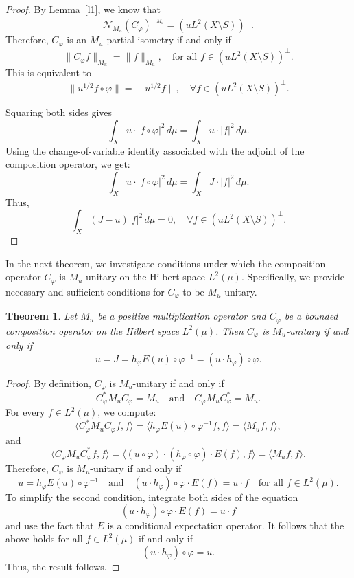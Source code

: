 \documentclass{amsart}
\newtheorem{thm}{Theorem}[section]
\theoremstyle{definition}\newtheorem{defn}[thm]{Definition}
\theoremstyle{remark}
\numberwithin{equation}{section}
\begin{document}
\begin{proof}
By Lemma~\ref{l1}, we know that
\[
\mathcal{N}_{M_u}(C_{\varphi})^{\perp_{M_u}} = \left(u L^2(X \setminus S)\right)^{\perp}.
\]
Therefore, \( C_{\varphi} \) is an \( M_u \)-partial isometry if and only if
\[
\|C_{\varphi} f\|_{M_u} = \|f\|_{M_u}, \quad \text{for all } f \in \left(u L^2(X \setminus S)\right)^{\perp}.
\]
This is equivalent to
\[
\|u^{1/2} f \circ \varphi\| = \|u^{1/2} f\|, \quad \forall f \in \left(u L^2(X \setminus S)\right)^{\perp}.
\]

Squaring both sides gives
\[
\int_X u \cdot |f \circ \varphi|^2 \, d\mu = \int_X u \cdot |f|^2 \, d\mu.
\]
Using the change-of-variable identity associated with the adjoint of the composition operator, we get:
\[
\int_X u \cdot |f \circ \varphi|^2 \, d\mu = \int_X J \cdot |f|^2 \, d\mu.
\]
Thus,
\[
\int_X (J - u) |f|^2 \, d\mu = 0, \quad \forall f \in \left(u L^2(X \setminus S)\right)^{\perp}.
\]
\end{proof}
In the next theorem, we investigate conditions under which the composition operator \( C_{\varphi} \) is \( M_u \)-unitary on the Hilbert space \( L^2(\mu) \). Specifically, we provide necessary and sufficient conditions for \( C_{\varphi} \) to be \( M_u \)-unitary.

\begin{thm}\label{t1.6}
Let \( M_u \) be a positive multiplication operator and \( C_{\varphi} \) be a bounded composition operator on the Hilbert space \( L^2(\mu) \). Then \( C_{\varphi} \) is \( M_u \)-unitary if and only if
\[
u = J = h_{\varphi} E(u) \circ \varphi^{-1} = (u \cdot h_{\varphi}) \circ \varphi.
\]
\end{thm}

\begin{proof}
By definition, \( C_{\varphi} \) is \( M_u \)-unitary if and only if
\[
C_{\varphi}^* M_u C_{\varphi} = M_u \quad \text{and} \quad C_{\varphi} M_u C_{\varphi}^* = M_u.
\]
For every \( f \in L^2(\mu) \), we compute:
\[
\langle C_{\varphi}^* M_u C_{\varphi} f, f \rangle = \langle h_{\varphi} E(u) \circ \varphi^{-1} f, f \rangle = \langle M_u f, f \rangle,
\]
and
\[
\langle C_{\varphi} M_u C_{\varphi}^* f, f \rangle = \langle (u \circ \varphi) \cdot (h_{\varphi} \circ \varphi) \cdot E(f), f \rangle = \langle M_u f, f \rangle.
\]
Therefore, \( C_{\varphi} \) is \( M_u \)-unitary if and only if
\[
u = h_{\varphi} E(u) \circ \varphi^{-1} \quad \text{and} \quad (u \cdot h_{\varphi}) \circ \varphi \cdot E(f) = u \cdot f \quad \text{for all } f \in L^2(\mu).
\]
To simplify the second condition, integrate both sides of the equation
\[
(u \cdot h_{\varphi}) \circ \varphi \cdot E(f) = u \cdot f
\]
and use the fact that \( E \) is a conditional expectation operator. It follows that the above holds for all \( f \in L^2(\mu) \) if and only if
\[
(u \cdot h_{\varphi}) \circ \varphi = u.
\]
Thus, the result follows.
\end{proof}
\end{document}
